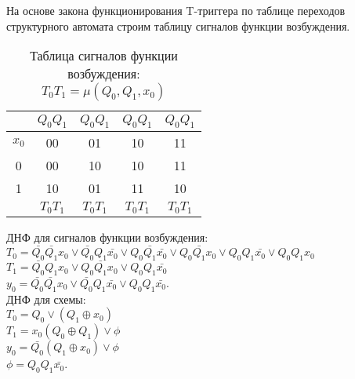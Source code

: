 \documentclass[a4paper,10pt]{article}
\begin{document}
			На основе закона функционирования T-триггера по таблице переходов структурного автомата
			строим таблицу сигналов функции возбуждения. \\

    		\begin{table}[h!]
				\center
        		\begin{tabular}{|c|c|c|c|c|}
        			\hline
							  &$Q_0Q_1$  &$Q_0Q_1$  &$Q_0Q_1$  &$Q_0Q_1$  \\ \hline
            		 $x_0$    & 00       & 01       & 10       & 11 \\ \hline
            			 0	  & 00       & 10       & 10       & 11 \\ \hline 
            			 1    & 10       & 01       & 11       & 10 \\ \hline
							  & $T_0T_1$ & $T_0T_1$ & $T_0T_1$ & $T_0T_1$ \\ \hline
        		\end{tabular}
    			\caption{Таблица сигналов функции возбуждения: $T_0T_1 = \mu(Q_0,Q_1,x_0)$}
    		\end{table}

			ДНФ для сигналов функции возбуждения: \\
			$T_0 = \bar{Q_0} \bar{Q_1} x_0 \lor \bar{Q_0} Q_1 \bar{x_0} \lor Q_0 \bar{Q_1} \bar{x_0} \lor Q_0 \bar{Q_1} x_0 \lor Q_0 Q_1 \bar{x_0} \lor Q_0 Q_1 x_0 $ \\
			$T_1 = \bar{Q_0} Q_1 x_0 \lor Q_0 \bar{Q_1} x_0 \lor Q_0 Q_1 \bar{x_0}$ \\
        	$y_0 = \bar{Q_0} \bar{Q_1} x_0 \lor \bar{Q_0} Q_1 \bar{x_0} \lor Q_0 Q_1 \bar{x_0}$. \\

	 		ДНФ для схемы: \\
			$T_0 = Q_0 \lor (Q_1 \oplus x_0)$ \\
			$T_1 = x_0 (Q_0 \oplus Q_1) \lor \phi$ \\
			$y_0 = \bar{Q_0} (Q_1 \oplus x_0) \lor \phi$ \\
			$\phi = Q_0 Q_1 \bar{x_0}$.
\end{document}
